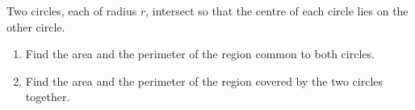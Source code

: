 Two circles, each of radius $r$, intersect so that the centre of each circle lies on the other circle.
\begin{enumerate}
\item[(a)] Find the area and the perimeter of the region common to both circles.
\item[(b)] Find the area and the perimeter of the region covered by the two circles together.
\end{enumerate}
